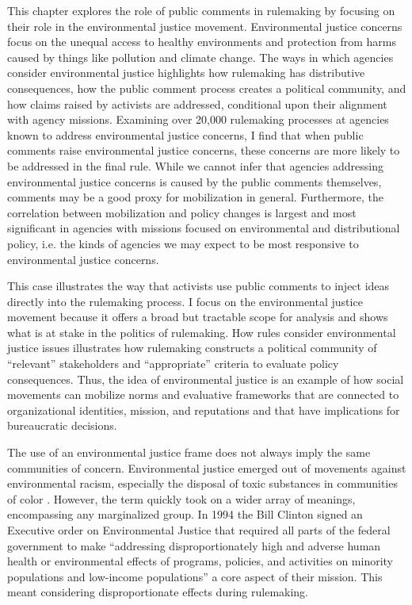 This chapter 
explores the role of public comments in rulemaking by focusing on their role in the environmental justice movement. Environmental justice concerns focus on the unequal access to healthy environments and protection from harms caused by things like pollution and climate change. The ways in which agencies consider environmental justice highlights how rulemaking has distributive consequences, how the public comment process creates a political community, and how claims raised by activists are addressed, conditional upon their alignment with agency missions. Examining over 20,000 rulemaking processes at agencies known to address environmental justice concerns, I find that when public comments raise environmental justice concerns, these concerns are more likely to be addressed in the final rule. While we cannot infer that agencies addressing environmental justice concerns is caused by the public comments themselves, comments may be a good proxy for mobilization in general. Furthermore, the correlation between mobilization and policy changes is largest and most significant in agencies with missions focused on environmental and distributional policy, i.e. the kinds of agencies we may expect to be most responsive to environmental justice concerns.

This case illustrates the way that activists use public comments to inject ideas directly into the rulemaking process. I focus on the environmental justice movement because it offers a broad but tractable scope for analysis and shows what is at stake in the politics of rulemaking.  How rules consider environmental justice issues illustrates how rulemaking constructs a political community of ``relevant'' stakeholders and ``appropriate'' criteria to evaluate policy consequences. Thus, the idea of environmental justice is an example of how social movements can mobilize norms and evaluative frameworks that are connected to organizational identities, mission, and reputations and that have implications for bureaucratic decisions. 

The use of an environmental justice frame does not always imply the same communities of concern. Environmental justice emerged out of movements against environmental racism, especially the disposal of toxic substances in communities of color \citep{Bullard1993}. However, the term quickly took on a wider array of meanings, encompassing any marginalized group. In 1994 the Bill Clinton signed an Executive order on Environmental Justice that required all parts of the federal government to make ``addressing disproportionately high and adverse human health or environmental effects of programs, policies, and activities on minority populations and low-income populations'' a core aspect of their mission. This meant considering disproportionate effects during rulemaking.

